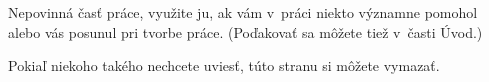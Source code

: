 %
%

Nepovinná časť práce, využite ju, ak vám v práci niekto významne pomohol alebo
vás posunul pri tvorbe práce. (Poďakovať sa môžete tiež v časti Úvod.)

Pokiaľ niekoho takého nechcete uviesť, túto stranu si môžete vymazať. 

